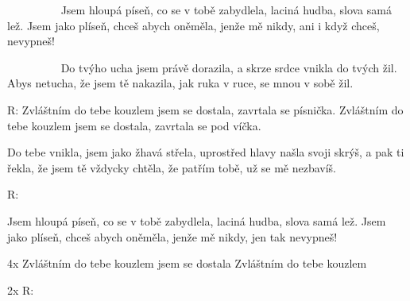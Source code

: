 \resetVars
{}
\MakeHeader
\Lyrics

~~~~~~~~~
Jsem hloupá píseň, co se v tobě zabydlela,
laciná hudba, slova samá lež.
Jsem jako plíseň, chceš abych oněměla,
jenže mě nikdy, ani i když chceš, nevypneš!

~~~~~~~~~
Do tvýho ucha jsem právě dorazila,
a skrze srdce vnikla do tvých žil.
Abys netucha, že jsem tě nakazila,
jak ruka v ruce, se mnou v sobě žil.

R: Zvláštním do tebe kouzlem jsem se dostala, 
zavrtala se písnička.
Zvláštním do tebe kouzlem jsem se dostala, 
zavrtala se pod víčka.

Do tebe vnikla, jsem jako žhavá střela, 
uprostřed hlavy našla svoji skrýš, 
a pak ti řekla, že jsem tě vždycky chtěla, 
že patřím tobě, už se mě nezbavíš. 

R:

Jsem hloupá píseň, co se v tobě zabydlela, 
laciná hudba, slova samá lež. 
Jsem jako plíseň, chceš abych oněměla, 
jenže mě nikdy, jen tak nevypneš! 

4x Zvláštním do tebe kouzlem jsem se dostala
Zvláštním do tebe kouzlem

2x R:

\Next

